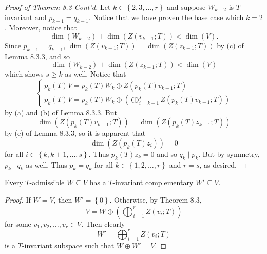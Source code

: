 \documentclass[linearalgebra]{subfiles}
\begin{document}
    \begin{proof}[Proof of Theorem 8.3 Cont'd]
        Let $k\in \left\lbrace 2,3,\ldots,r \right\rbrace$ and suppose $W_{k-2}$ is $T$-invariant and $p_{k-1} = q_{k-1}$. Notice that we have proven the base case which $k=2$. Moreover, notice that
        \begin{equation*}
            \dim\left( W_{k-2} \right) + \dim\left( Z\left( v_{k-1};T \right)  \right) < \dim(V).
        \end{equation*}
        Since $p_{k-1} = q_{k-1}$, $\dim\left( Z\left(v_{k-1};T\right) \right) = \dim\left( Z\left( z_{k-1};T \right)  \right)$ by (c) of Lemma 8.3.3, and so
        \begin{equation*}
            \dim\left( W_{k-2} \right) + \dim\left( Z\left( z_{k-1};T \right)  \right) < \dim(V)
        \end{equation*}
        which shows $s\geq k$ as well. Notice that
        \begin{equation*}
            \begin{cases} 
                p_k(T)V = p_k(T)W_k \oplus Z\left( p_k(T)v_{k-1};T \right)  \\ 
                p_k(T)V = p_k(T)W_k \oplus \left(\bigoplus^{s}_{i=k-1} Z\left( p_k(T)v_{k-1};T \right)\right) 
            \end{cases}
        \end{equation*}
        by (a) and (b) of Lemma 8.3.3. But
        \begin{equation*}
            \dim\left( Z\left( p_k(T)v_{k-1};T \right)  \right) = \dim\left( Z\left( p_k(T)z_{k-1};T \right) \right) 
        \end{equation*}
        by (c) of Lemma 8.3.3, so it is apparent that
        \begin{equation*}
            \dim\left( Z\left( p_k(T)z_i \right)  \right) = 0
        \end{equation*}
        for all $i\in \left\lbrace k, k+1, \ldots, s \right\rbrace$. Thus $p_k(T)z_k = 0$ and so $q_k\mid p_k$. But by symmetry, $p_k\mid q_k$ as well. Thus $p_k = q_k$ for all $k\in \left\lbrace 1,2,\ldots,r \right\rbrace$ and $r=s$, as desired.
    \end{proof}

    \begin{cor}{}
        Every $T$-admissible $W\subseteq V$ has a $T$-invariant complementary $W'\subseteq V$.
    \end{cor}	

    \begin{proof}
        If $W=V$, then $W'=\left\lbrace 0 \right\rbrace$. Otherwise, by Theorem 8.3,
        \begin{equation*}
            V = W\oplus \left( \bigoplus^{r}_{i=1} Z\left( v_i;T \right)  \right) 
        \end{equation*}
        for some $v_1,v_2,\ldots,v_r\in V$. Then clearly
        \begin{equation*}
            W' = \bigoplus^{r}_{i=1} Z(v_i;T)
        \end{equation*}
        is a $T$-invariant subspace such that $W\oplus W' = V$.
    \end{proof}
\end{document}
